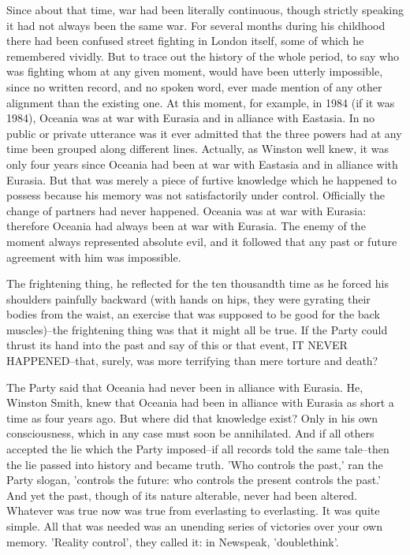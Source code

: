 \documentclass{article}
\begin{document}
Since about that time, war had been literally continuous, though strictly
speaking it had not always been the same war. For several months during his
childhood there had been confused street fighting in London itself, some
of which he remembered vividly. But to trace out the history of the whole
period, to say who was fighting whom at any given moment, would have been
utterly impossible, since no written record, and no spoken word, ever made
mention of any other alignment than the existing one. At this moment, for
example, in 1984 (if it was 1984), Oceania was at war with Eurasia and
in alliance with Eastasia. In no public or private utterance was it ever
admitted that the three powers had at any time been grouped along different
lines. Actually, as Winston well knew, it was only four years since Oceania
had been at war with Eastasia and in alliance with Eurasia. But that was
merely a piece of furtive knowledge which he happened to possess because
his memory was not satisfactorily under control. Officially the change of
partners had never happened. Oceania was at war with Eurasia: therefore
Oceania had always been at war with Eurasia. The enemy of the moment always
represented absolute evil, and it followed that any past or future
agreement with him was impossible.

The frightening thing, he reflected for the ten thousandth time as he
forced his shoulders painfully backward (with hands on hips, they were
gyrating their bodies from the waist, an exercise that was supposed to be
good for the back muscles)--the frightening thing was that it might all be
true. If the Party could thrust its hand into the past and say of this or
that event, IT NEVER HAPPENED--that, surely, was more terrifying than mere
torture and death?

The Party said that Oceania had never been in alliance with Eurasia. He,
Winston Smith, knew that Oceania had been in alliance with Eurasia as short
a time as four years ago. But where did that knowledge exist? Only in his
own consciousness, which in any case must soon be annihilated. And if all
others accepted the lie which the Party imposed--if all records told the
same tale--then the lie passed into history and became truth. 'Who controls
the past,' ran the Party slogan, 'controls the future: who controls the
present controls the past.' And yet the past, though of its nature
alterable, never had been altered. Whatever was true now was true from
everlasting to everlasting. It was quite simple. All that was needed was
an unending series of victories over your own memory. 'Reality control',
they called it: in Newspeak, 'doublethink'.
\end{document}
